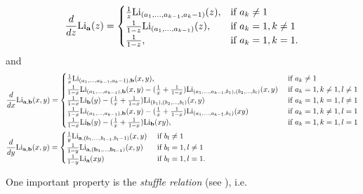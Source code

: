 \documentclass[a4paper,fleqn]{cas-sc}
\begin{document}
\begin{equation}
	\frac{d}{dz}\text{Li}_{\bf{a}}(z)=\begin{cases}
		\frac{1}{z}\text{Li}_{(a_1,\dots,a_{k-1},a_k-1)}(z), & \text{if $a_k\ne 1$}\\
		\frac{1}{1-z}\text{Li}_{(a_1,\dots,a_{k-1})}(z), & \text{if $a_k=1,k\ne 1$}\\
		\frac{1}{1-z}, & \text{if } a_k=1, k=1.
	\end{cases}
\end{equation}
and
\begin{equation}\label{equation:2_variables_different_equation}
\begin{split}
	&\frac{d}{dx}\text{Li}_{\bf{a},\bf{b}}(x,y)=\begin{cases}
		\frac{1}{x}\text{Li}_{(a_1,\dots,a_{k-1},a_k-1),{\bf{b}}}(x,y),&~\text{if}~a_k\ne 1 \\
		\frac{1}{1-x}\text{Li}_{(a_1,\dots,a_{k-1}),\bold b}(x,y)-(\frac{1}{x}+\frac{1}{1-x})\text{Li}_{(a_1,\dots,a_{k-1},b_1),(b_2,\dots,b_l)}(x,y)
		&~\text{if}~a_k=1,k\ne 1 ,l\ne 1\\
		\frac{1}{1-x}\text{Li}_{{\bf{b}}}(y)-(\frac{1}{x}+\frac{1}{1-x})\text{Li}_{(b_1),(b_2,\dots,b_l)}(x,y)&~\text{if}~a_k=1,k=1,l\ne 1\\
		\frac{1}{1-x}\text{Li}_{(a_1,\dots,a_{k-1}),{\bf{b}}}(x,y)-(\frac{1}{x}+\frac{1}{1-x})\text{Li}_{(a_1,\dots,a_{k-1},b_1)}(xy)
		&~\text{if}~a_k=1,k\ne 1,l=1\\
		\frac{1}{1-x}\text{Li}_{\bf{b}}(y)-(\frac{1}{x}+\frac{1}{1-x})\text{Li}_{\bf{b}}(xy),&~\text{if}~a_k=1,k=1,l=1
	\end{cases}\\
	&\frac{d}{dy}\text{Li}_{\bf{a},\bf{b}}(x,y)=\begin{cases}
		\frac{1}{y}\text{Li}_{{\bf{a}},(b_1,\dots,b_{l-1},b_l-1)}(x,y) &~\text{if}~b_l\ne 1\\
		\frac{1}{1-y}\text{Li}_{\bf{a},(b_1,\dots,b_{l-1})}(x,y)& ~\text{if}~b_l=1,l\ne 1\\
		\frac{1}{1-y}\text{Li}_{\bf{a}}(xy) &~\text{if}~b_l=1,l=1.
	\end{cases} 
\end{split}
\end{equation}

One important property is the \textit{stuffle relation} (see \cite{Furusho2011, CS}), i.e. 
\end{document}
